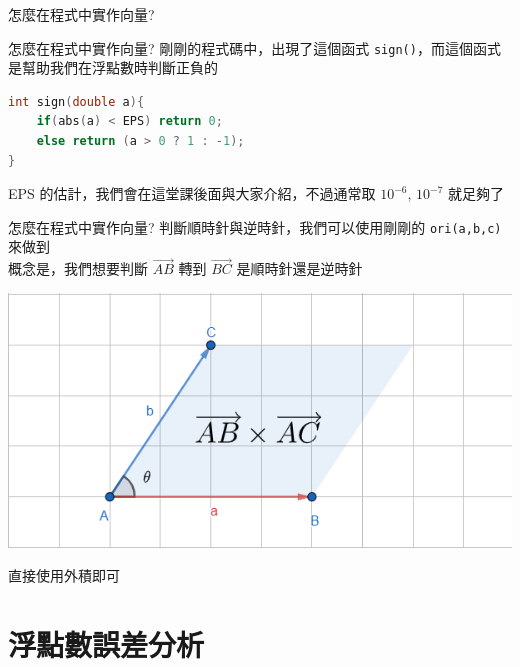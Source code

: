 \documentclass[aspectratio=169]{beamer}
\begin{document}
\begin{frame}{怎麼在程式中實作向量?}
    
\end{frame}

\begin{frame}[fragile]{怎麼在程式中實作向量?}
    剛剛的程式碼中，出現了這個函式 \texttt{sign()}，而這個函式是幫助我們在浮點數時判斷正負的
    \begin{lstlisting}[language=C++, basicstyle=\ttfamily\small]
int sign(double a){
    if(abs(a) < EPS) return 0;
    else return (a > 0 ? 1 : -1);
}
    \end{lstlisting}
    EPS 的估計，我們會在這堂課後面與大家介紹，不過通常取 $10^{-6}$, $10^{-7}$ 就足夠了
\end{frame}

\begin{frame}[fragile]{怎麼在程式中實作向量?}
    判斷順時針與逆時針，我們可以使用剛剛的 \texttt{ori(a,b,c)} 來做到 \\
    \vspace{5mm}
    概念是，我們想要判斷 $\overrightarrow{AB}$ 轉到 $\overrightarrow{BC}$ 是順時針還是逆時針 
    \begin{center}
        \includegraphics[scale=0.5]{images/ori.png}
    \end{center}
    直接使用外積即可
\end{frame}

\section{浮點數誤差分析}
\end{document}
